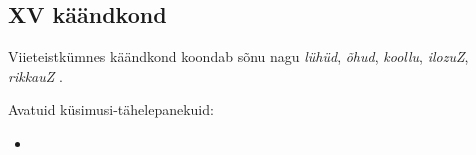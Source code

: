 \documentclass[12pt,a4paper]{article}
\newcommand{\vadja}[1]{\textit{#1}}
\newcommand{\msd}[1]{\textsc{#1}}
\begin{document}
\subsection{\RN{15} käändkond}

Viieteistkümnes käändkond koondab sõnu nagu \vadja{lühüd}, \vadja{õhud}, \vadja{koollu}, \vadja{ilozuZ}, \vadja{rikkauZ} \cite[51]{ariste_grammar_1968}.

Avatuid küsimusi-tähelepanekuid:
\begin{itemize}
\item 
\end{itemize}


% 
% 
% 
\end{document}
